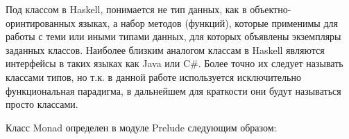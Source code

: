 Под классом в Haskell, понимается не тип данных, как в объектно-оринтированных языках, а набор методов (функций), которые применимы для работы с теми или иными типами данных, для которых объявлены экземпляры заданных классов. Наиболее близким аналогом классам в Haskell являются интерфейсы в таких языках как Java или C\#. Более точно их следует называть классами типов, но т.к. в данной работе используется исключительно функциональная парадигма, в дальнейшем для краткости они будут называться просто классами.

Класс Monad определен в модуле Prelude следующим образом:



